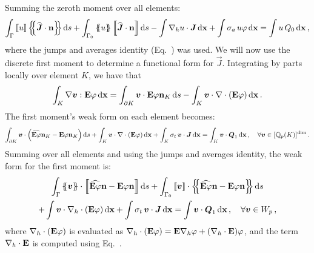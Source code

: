\documentclass[../doc.tex]{subfiles}
\begin{document}
Summing the zeroth moment over all elements: 
	\begin{equation}
		\int_\Gamma \jump{u} \avg{\widehat{\vec{J}}\cdot\n} \ud s + \int_{\Gamma_0} \avg{u}\jump{\widehat{\vec{J}}\cdot\n} \ud s - \int \nablah u \cdot \vec{J} \ud \x + \int \sigma_a \, u\varphi \ud \x = \int u\, Q_0 \ud \x \,,
	\end{equation}
where the jumps and averages identity (Eq.~) was used. We will now use the discrete first moment to determine a functional form for $\vec{J}$. Integrating by parts locally over element $K$, we have that 
	\begin{equation} \label{dgvef:identity}
		\int_K \nabla\boldsymbol{v} : \boldsymbol{\mathrm{E}} \varphi \mathop{}\!\mathrm{d} \boldsymbol{\mathrm{x}} = \int_{\partial K} \boldsymbol{v}\cdot\boldsymbol{\mathrm{E}}\varphi\boldsymbol{\mathrm{n}}_K \mathop{}\!\mathrm{d} s - \int_K \boldsymbol{v}\cdot\nabla\cdot\left( \boldsymbol{\mathrm{E}}\varphi \right) \mathop{}\!\mathrm{d} \boldsymbol{\mathrm{x}} \,. 
	\end{equation}
The first moment's weak form on each element becomes: 
	\begin{equation}
		\int_{\partial K} \boldsymbol{v}\cdot\left( \widehat{\boldsymbol{\mathrm{E}}\varphi}\boldsymbol{\mathrm{n}}_K - \boldsymbol{\mathrm{E}}\varphi\boldsymbol{\mathrm{n}}_K \right) \mathop{}\!\mathrm{d} s + \int_K \boldsymbol{v}\cdot\nabla\cdot\left( \boldsymbol{\mathrm{E}}\varphi \right) \mathop{}\!\mathrm{d} \boldsymbol{\mathrm{x}} + \int_K \sigma_t \, \boldsymbol{v}\cdot\boldsymbol{J} \mathop{}\!\mathrm{d} \boldsymbol{\mathrm{x}} = \int_K \boldsymbol{v} \cdot\boldsymbol{Q}_1 \mathop{}\!\mathrm{d} \boldsymbol{\mathrm{x}} \,, \quad \forall \boldsymbol{v} \in [\mathbb{Q}_p(K)]^{\dim} \,. 
	\end{equation}
Summing over all elements and using the jumps and averages identity, the weak form for the first moment is:  
	\begin{multline} \label{dgvef:weak_strong}
		\int_\Gamma \avg{\vec{v}}\cdot\jump{\widehat{\E\varphi}\n - \E\varphi\n} \ud s + \int_{\Gamma_0} \jump{\vec{v}} \cdot \avg{\widehat{\E\varphi}\n - \E\varphi\n} \ud s \\+ \int \vec{v}\cdot\nablah \cdot\paren{\E\varphi} \ud \x + \int \sigma_t \, \vec{v}\cdot\vec{J} \ud \x = \int \vec{v}\cdot\vec{Q}_1 \ud \x \,, \quad \forall \vec{v} \in W_p \,, 
	\end{multline}
where $\nabla_h\cdot\left( \boldsymbol{\mathrm{E}}\varphi \right)$ is evaluated as $\nabla_h\cdot\left( \boldsymbol{\mathrm{E}}\varphi \right) = \boldsymbol{\mathrm{E}}\nabla_h \varphi + \left( \nabla_h\cdot\boldsymbol{\mathrm{E}} \right)\!\varphi$, and the term $\nabla_h\cdot\boldsymbol{\mathrm{E}}$ is computed using Eq.~. 
\end{document}
